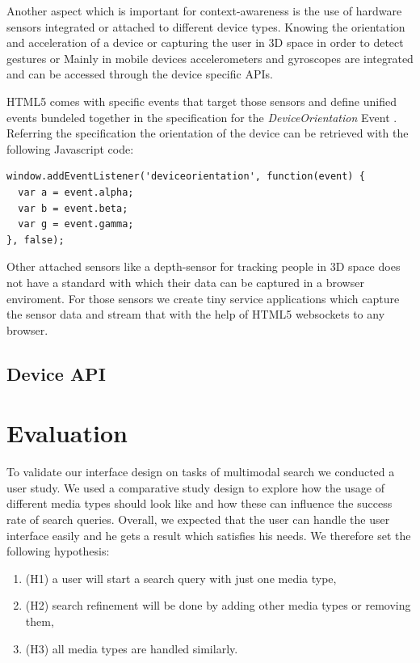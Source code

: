 \documentclass[runningheads,a4paper]{llncs} \usepackage[utf8]{inputenc}
\begin{document}
Another aspect which is important for context-awareness is the use of
hardware sensors integrated or attached to different device types. 
Knowing the orientation and acceleration of a device or capturing the user
in 3D space in order to detect gestures or
Mainly in mobile devices accelerometers and gyroscopes are integrated and
can be accessed through the device specific APIs. 

HTML5 comes with specific events that target those sensors and define unified
events bundeled together in the specification for the \emph{DeviceOrientation}
Event \cite{deviceOrientation}. Referring the specification the orientation of
the device can be retrieved with the following Javascript code:
\begin{lstlisting}
window.addEventListener('deviceorientation', function(event) {
  var a = event.alpha;
  var b = event.beta;
  var g = event.gamma;
}, false);
\end{lstlisting}

Other attached sensors like a depth-sensor for tracking people in 3D space
does not have a standard with which their data can be captured in a browser
enviroment. For those sensors we create tiny service applications which capture
the sensor data and stream that with the help of HTML5 websockets
\cite{websockets} to any browser.

\subsection{Device API}



\section{Evaluation}

To validate our interface design on tasks of multimodal search we conducted a
user study. We used a comparative study design to explore how the usage of
different media types should look like and how these can influence the success
rate of search queries. Overall, we expected that the user can handle the user
interface easily and he gets a result which satisfies his needs. We therefore
set the following hypothesis: 
\begin{enumerate}
  \item (H1) a user will start a search query with just
one media type,
  \item (H2) search refinement will be done by adding other media types
or removing them,
  \item (H3) all media types are handled similarly. 
\end{enumerate}
\end{document}
